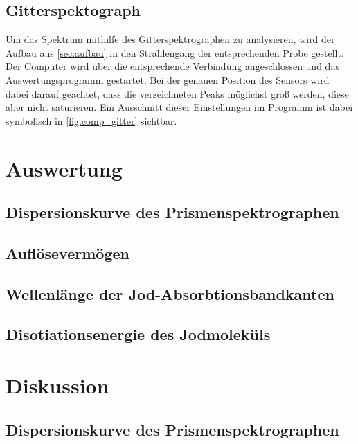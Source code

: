 \documentclass[12pt,english,ngerman]{scrartcl}
\begin{document}
\subsection{Gitterspektograph}

Um das Spektrum mithilfe des Gitterspektrographen zu analysieren, wird der Aufbau aus \autoref{sec:aufbau} in den Strahlengang
der entsprechenden Probe gestellt. Der Computer wird über die entsprechende Verbindung angeschlossen und das 
Auswertungsprogramm gestartet. Bei der genauen Position des Sensors wird dabei darauf geachtet, dass die verzeichneten
Peaks möglichst groß werden, diese aber nicht saturieren. Ein Ausschnitt dieser Einstellungen im Programm ist dabei symbolisch 
in \autoref{fig:comp_gitter} sichtbar.



\section{Auswertung}\label{sec:auswertung}


\subsection{Dispersionskurve des Prismenspektrographen}


\subsection{Auflösevermögen}


\subsection{Wellenlänge der Jod-Absorbtionsbandkanten}


\subsection{Disotiationsenergie des Jodmoleküls}


\section{Diskussion}\label{sec:disk}


\subsection{Dispersionskurve des Prismenspektrographen}
\end{document}
